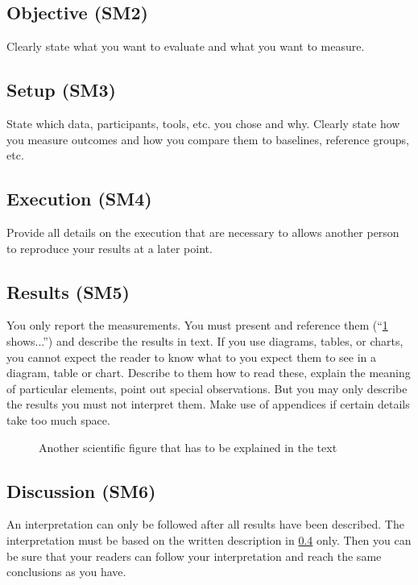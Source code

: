 \documentclass[peerreview,a4paper,english]{IEEEtran}[2015/08/26]
\begin{document}
\subsection{Objective (SM2)}\label{sec:evaluation:objective}
Clearly state what you want to evaluate and what you want to measure.
\subsection{Setup (SM3)}\label{sec:evaluation:setup}
State which data, participants, tools, etc. you chose and why. Clearly state how you measure outcomes and how you compare them to baselines, reference groups, etc.
\subsection{Execution (SM4)}\label{sec:evaluation:execution}
Provide all details on the execution that are necessary to allows another person to reproduce your results at a later point.
\subsection{Results (SM5)}\label{sec:evaluation:results}
You only report the measurements. You must present and reference them (``\cref{fig:my_label2} shows...'') and describe the results in text. If you use diagrams, tables, or charts, you cannot expect the reader to know what to you expect them to see in a diagram, table or chart. Describe to them how to read these, explain the meaning of particular elements, point out special observations. But you may only describe the results you must not interpret them. Make use of appendices if certain details take too much space.
\begin{figure}
    \centering
    \caption{Another scientific figure that has to be explained in the text}
    \label{fig:my_label2}
\end{figure}
\subsection{Discussion (SM6)}\label{sec:evaluation:discussion}
An interpretation can only be followed after all results have been described. The interpretation must be based on the written description in \cref{sec:evaluation:results} only. Then you can be sure that your readers can follow your interpretation and reach the same conclusions as you have.
\end{document}
